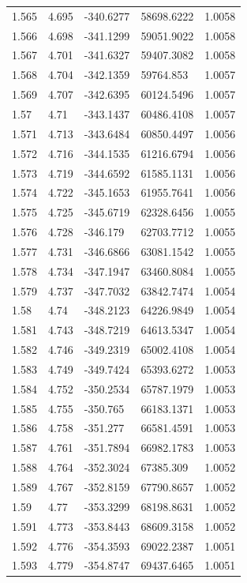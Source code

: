 \begin{tabular}{lllll}
1.565 & 4.695 & -340.6277 & 58698.6222 & 1.0058 \\
1.566 & 4.698 & -341.1299 & 59051.9022 & 1.0058 \\
1.567 & 4.701 & -341.6327 & 59407.3082 & 1.0058 \\
1.568 & 4.704 & -342.1359 & 59764.853 & 1.0057 \\
1.569 & 4.707 & -342.6395 & 60124.5496 & 1.0057 \\
1.57 & 4.71 & -343.1437 & 60486.4108 & 1.0057 \\
1.571 & 4.713 & -343.6484 & 60850.4497 & 1.0056 \\
1.572 & 4.716 & -344.1535 & 61216.6794 & 1.0056 \\
1.573 & 4.719 & -344.6592 & 61585.1131 & 1.0056 \\
1.574 & 4.722 & -345.1653 & 61955.7641 & 1.0056 \\
1.575 & 4.725 & -345.6719 & 62328.6456 & 1.0055 \\
1.576 & 4.728 & -346.179 & 62703.7712 & 1.0055 \\
1.577 & 4.731 & -346.6866 & 63081.1542 & 1.0055 \\
1.578 & 4.734 & -347.1947 & 63460.8084 & 1.0055 \\
1.579 & 4.737 & -347.7032 & 63842.7474 & 1.0054 \\
1.58 & 4.74 & -348.2123 & 64226.9849 & 1.0054 \\
1.581 & 4.743 & -348.7219 & 64613.5347 & 1.0054 \\
1.582 & 4.746 & -349.2319 & 65002.4108 & 1.0054 \\
1.583 & 4.749 & -349.7424 & 65393.6272 & 1.0053 \\
1.584 & 4.752 & -350.2534 & 65787.1979 & 1.0053 \\
1.585 & 4.755 & -350.765 & 66183.1371 & 1.0053 \\
1.586 & 4.758 & -351.277 & 66581.4591 & 1.0053 \\
1.587 & 4.761 & -351.7894 & 66982.1783 & 1.0053 \\
1.588 & 4.764 & -352.3024 & 67385.309 & 1.0052 \\
1.589 & 4.767 & -352.8159 & 67790.8657 & 1.0052 \\
1.59 & 4.77 & -353.3299 & 68198.8631 & 1.0052 \\
1.591 & 4.773 & -353.8443 & 68609.3158 & 1.0052 \\
1.592 & 4.776 & -354.3593 & 69022.2387 & 1.0051 \\
1.593 & 4.779 & -354.8747 & 69437.6465 & 1.0051 \\

\end{tabular}
